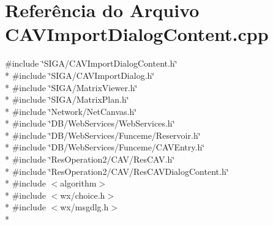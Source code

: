 \section{Referência do Arquivo C\+A\+V\+Import\+Dialog\+Content.\+cpp}
\label{_c_a_v_import_dialog_content_8cpp}
{\ttfamily \#include \char`\"{}S\+I\+G\+A/\+C\+A\+V\+Import\+Dialog\+Content.\+h\char`\"{}}\\*
{\ttfamily \#include \char`\"{}S\+I\+G\+A/\+C\+A\+V\+Import\+Dialog.\+h\char`\"{}}\\*
{\ttfamily \#include \char`\"{}S\+I\+G\+A/\+Matrix\+Viewer.\+h\char`\"{}}\\*
{\ttfamily \#include \char`\"{}S\+I\+G\+A/\+Matrix\+Plan.\+h\char`\"{}}\\*
{\ttfamily \#include \char`\"{}Network/\+Net\+Canvas.\+h\char`\"{}}\\*
{\ttfamily \#include \char`\"{}D\+B/\+Web\+Services/\+Web\+Services.\+h\char`\"{}}\\*
{\ttfamily \#include \char`\"{}D\+B/\+Web\+Services/\+Funceme/\+Reservoir.\+h\char`\"{}}\\*
{\ttfamily \#include \char`\"{}D\+B/\+Web\+Services/\+Funceme/\+C\+A\+V\+Entry.\+h\char`\"{}}\\*
{\ttfamily \#include \char`\"{}Res\+Operation2/\+C\+A\+V/\+Res\+C\+A\+V.\+h\char`\"{}}\\*
{\ttfamily \#include \char`\"{}Res\+Operation2/\+C\+A\+V/\+Res\+C\+A\+V\+Dialog\+Content.\+h\char`\"{}}\\*
{\ttfamily \#include $<$algorithm$>$}\\*
{\ttfamily \#include $<$wx/choice.\+h$>$}\\*
{\ttfamily \#include $<$wx/msgdlg.\+h$>$}\\*
